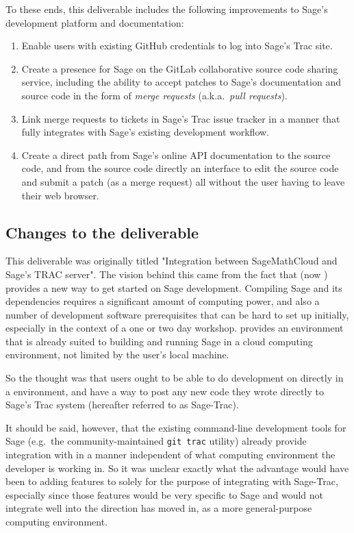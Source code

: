 To these ends, this deliverable includes the following improvements to Sage's
development platform and documentation:
\begin{enumerate}
\item Enable users with existing GitHub credentials to log into Sage's
    Trac site.
\item Create a presence for Sage on the GitLab collaborative source code
    sharing service, including the ability to accept patches to Sage's
    documentation and source code in the form of {\em merge requests}
    (a.k.a.~{\em pull requests}).
\item Link \GitLab merge requests to tickets in Sage's Trac issue tracker in
    a manner that fully integrates with Sage's existing development workflow.
\item Create a direct path from Sage's online API documentation to the source
    code, and from the source code directly an interface to edit the source
    code and submit a patch (as a merge request) all without the user having to
    leave their web browser.
\end{enumerate}



\hypertarget{changes-to-deliverable}{%
\subsection{Changes to the deliverable\label{changes-to-deliverable}}}

This deliverable was originally titled "Integration between SageMathCloud and
Sage's TRAC server".  The vision behind this came from the fact that \SMC (now
\cocalc) provides a new way to get started on Sage development.  Compiling Sage
and its dependencies requires a significant amount of computing power, and also
a number of development software prerequisites that can be hard to set up
initially, especially in the context of a one or two day workshop.  \cocalc
provides an environment that is already suited to building and running Sage in
a cloud computing environment, not limited by the user's local machine.

So the thought was that users ought to be able to do development on \Sage
directly in a \cocalc environment, and have a way to post any new code they
wrote directly to Sage's Trac system (hereafter referred to as Sage-Trac).

It should be said, however, that the existing command-line development tools
for Sage (e.g.~the community-maintained {\tt git trac} utility) already provide
integration with \Trac in a manner independent of what computing environment
the developer is working in.  So it was unclear exactly what the advantage
would have been to adding features to \cocalc solely for the purpose of
integrating with Sage-Trac, especially since those features would be very
specific to Sage and would not integrate well into the direction \cocalc has
moved in, as a more general-purpose computing environment.

